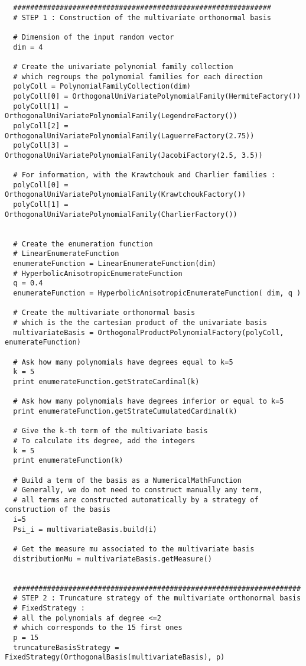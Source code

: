 \begin{lstlisting}
  #############################################################
  # STEP 1 : Construction of the multivariate orthonormal basis

  # Dimension of the input random vector
  dim = 4

  # Create the univariate polynomial family collection
  # which regroups the polynomial families for each direction
  polyColl = PolynomialFamilyCollection(dim)
  polyColl[0] = OrthogonalUniVariatePolynomialFamily(HermiteFactory())
  polyColl[1] = OrthogonalUniVariatePolynomialFamily(LegendreFactory())
  polyColl[2] = OrthogonalUniVariatePolynomialFamily(LaguerreFactory(2.75))
  polyColl[3] = OrthogonalUniVariatePolynomialFamily(JacobiFactory(2.5, 3.5))

  # For information, with the Krawtchouk and Charlier families : 
  polyColl[0] = OrthogonalUniVariatePolynomialFamily(KrawtchoukFactory())
  polyColl[1] = OrthogonalUniVariatePolynomialFamily(CharlierFactory())
  

  # Create the enumeration function
  # LinearEnumerateFunction
  enumerateFunction = LinearEnumerateFunction(dim)
  # HyperbolicAnisotropicEnumerateFunction
  q = 0.4
  enumerateFunction = HyperbolicAnisotropicEnumerateFunction( dim, q )

  # Create the multivariate orthonormal basis
  # which is the the cartesian product of the univariate basis
  multivariateBasis = OrthogonalProductPolynomialFactory(polyColl, enumerateFunction)

  # Ask how many polynomials have degrees equal to k=5
  k = 5
  print enumerateFunction.getStrateCardinal(k)

  # Ask how many polynomials have degrees inferior or equal to k=5
  print enumerateFunction.getStrateCumulatedCardinal(k)

  # Give the k-th term of the multivariate basis
  # To calculate its degree, add the integers
  k = 5
  print enumerateFunction(k)

  # Build a term of the basis as a NumericalMathFunction
  # Generally, we do not need to construct manually any term,
  # all terms are constructed automatically by a strategy of construction of the basis
  i=5
  Psi_i = multivariateBasis.build(i)

  # Get the measure mu associated to the multivariate basis
  distributionMu = multivariateBasis.getMeasure()


  ####################################################################
  # STEP 2 : Truncature strategy of the multivariate orthonormal basis
  # FixedStrategy :
  # all the polynomials af degree <=2
  # which corresponds to the 15 first ones
  p = 15
  truncatureBasisStrategy = FixedStrategy(OrthogonalBasis(multivariateBasis), p)



\end{lstlisting}
